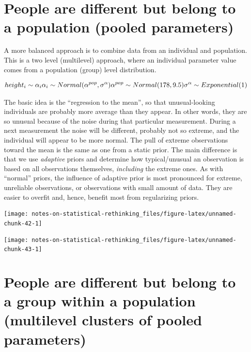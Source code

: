 \documentclass[
]{book}
\begin{document}
\hypertarget{people-are-different-but-belong-to-a-population-pooled-parameters}{%
\section{People are different but belong to a population (pooled parameters)}\label{people-are-different-but-belong-to-a-population-pooled-parameters}}

A more balanced approach is to combine data from an individual and population. This is a two level (multilevel) approach, where an individual parameter value comes from a population (group) level distribution.

\[height_i \sim \alpha_i\\
\alpha_i \sim Normal(\alpha^{pop}, \sigma^{\alpha})\\
\alpha^{pop} \sim Normal(178, 9.5)\\
\sigma^{\alpha} \sim Exponential(1)\]

The basic idea is the ``regression to the mean'', so that unusual-looking individuals are probably more average than they appear. In other words, they are so unusual because of the noise during that particular measurement. During a next measurement the noise will be different, probably not so extreme, and the individual will appear to be more normal. The pull of extreme observations toward the mean is the same as one from a static prior. The main difference is that we use \emph{adaptive} priors and determine how typical/unusual an observation is based on all observations themselves, \emph{including} the extreme ones. As with ``normal'' priors, the influence of adaptive prior is most pronounced for extreme, unreliable observations, or observations with small amount of data. They are easier to overfit and, hence, benefit most from regularizing priors.

\begin{center}\texttt{[image: notes-on-statistical-rethinking\_files/figure-latex/unnamed-chunk-42-1]} \end{center}

\begin{center}\texttt{[image: notes-on-statistical-rethinking\_files/figure-latex/unnamed-chunk-43-1]} \end{center}

\hypertarget{people-are-different-but-belong-to-a-group-within-a-population-multilevel-clusters-of-pooled-parameters}{%
\section{People are different but belong to a group within a population (multilevel clusters of pooled parameters)}\label{people-are-different-but-belong-to-a-group-within-a-population-multilevel-clusters-of-pooled-parameters}}
\end{document}
